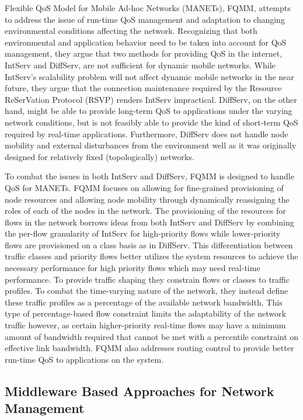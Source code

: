 Flexible QoS Model for Mobile Ad-hoc Networks (MANETs), FQMM\cite{Xiao2000}, attempts to address the issue of run-time QoS management and adaptation to changing environmental conditions affecting the network.  Recognizing that both environmental and application behavior need to be taken into account for QoS management, they argue that two methods for providing QoS in the internet, IntServ\cite{Braden1994} and DiffServ\cite{Blake1998}, are not sufficient for dynamic mobile networks.  While IntServ's scalability problem will not affect dynamic mobile networks in the near future, they argue that the connection maintenance required by the Resource ReSerVation Protocol (RSVP) renders IntServ impractical.  DiffServ, on the other hand, might be able to provide long-term QoS to applications under the varying network conditions, but is not feasibly able to provide the kind of short-term QoS required by real-time applications.  Furthermore, DiffServ does not handle node mobility and external disturbances from the environment well as it was originally designed for relatively fixed (topologically) networks.  

To combat the issues in both IntServ and DiffServ, FQMM is designed to handle QoS for MANETs.  FQMM focuses on allowing for fine-grained provisioning of node resources and allowing node mobility through dynamically reassigning the roles of each of the nodes in the network.  The provisioning of the resources for flows in the network borrows ideas from both IntServ and DiffServ by combining the per-flow granularity of IntServ for high-priority flows while lower-priority flows are provisioned on a class basis as in DiffServ.  This differentiation between traffic classes and priority flows better utilizes the system resources to achieve the necessary performance for high priority flows which may need real-time performance.  To provide traffic shaping they constrain flows or classes to traffic profiles.  To combat the time-varying nature of the network, they instead define these traffic profiles as a percentage of the available network bandwidth.  This type of percentage-based flow constraint limits the adaptability of the network traffic however, as certain higher-priority real-time flows may have a minimum amount of bandwidth required that cannot be met with a percentile constraint on effective link bandwidth.  FQMM also addresses routing control to provide better run-time QoS to applications on the system.

\subsection{Middleware Based Approaches for Network Management}
\label{subsec:related_part2_middleware}

